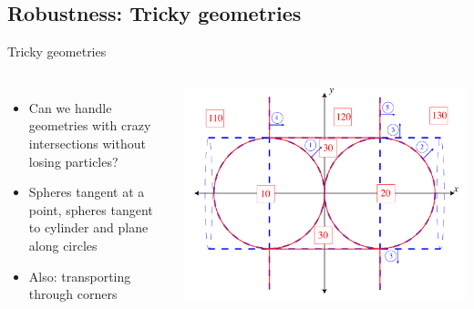 \documentclass[color={usenames, dvipsnames},ignorenonframetext]{beamer}
\begin{document}
\subsection{Robustness: Tricky geometries}
\begin{frame}{Tricky geometries}
\begin{columns}[c]
\begin{itemize}
  \item Can we handle geometries with crazy intersections without losing
    particles?
  \item Spheres tangent at a point, spheres tangent to cylinder and plane along
    circles
  \item Also: transporting through corners
\end{itemize}

    \includegraphics[width=\textwidth, keepaspectratio]{tricky_geometry}
\end{columns}
\end{frame}
\end{document}
